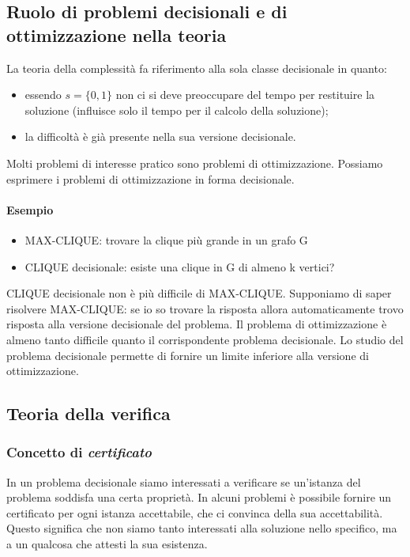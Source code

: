 \subsection{Ruolo di problemi decisionali e di ottimizzazione nella teoria}
La teoria della complessità fa riferimento alla sola classe decisionale in quanto:
\begin{itemize}
	\item essendo $s = \{0, 1\}$ non ci si deve preoccupare del tempo per restituire la soluzione (influisce solo il tempo per il calcolo della soluzione);
	\item la difficoltà è già presente nella sua versione decisionale.
\end{itemize} 
Molti problemi di interesse pratico sono problemi di ottimizzazione. Possiamo esprimere i problemi di ottimizzazione in forma decisionale.
\paragraph{Esempio}
\begin{itemize}
	\item MAX-CLIQUE: trovare la clique più grande in un grafo G
	\item CLIQUE decisionale: esiste una clique in G di almeno k vertici? 	
\end{itemize}
CLIQUE decisionale non è più difficile di MAX-CLIQUE. Supponiamo di saper risolvere MAX-CLIQUE: se io so trovare la risposta allora automaticamente trovo risposta alla versione decisionale del problema.  Il problema di ottimizzazione è almeno tanto difficile quanto il corrispondente problema decisionale. Lo studio del problema decisionale permette di fornire un limite inferiore alla versione di ottimizzazione.

\subsection{Teoria della verifica}
\subsubsection{Concetto di \emph{certificato}}
In un problema decisionale siamo interessati a verificare se un'istanza del problema soddisfa una certa proprietà. In alcuni problemi è possibile fornire un certificato per ogni istanza accettabile, che ci convinca della sua accettabilità. Questo significa che non siamo tanto interessati alla soluzione nello specifico, ma a un qualcosa che attesti la sua esistenza.

